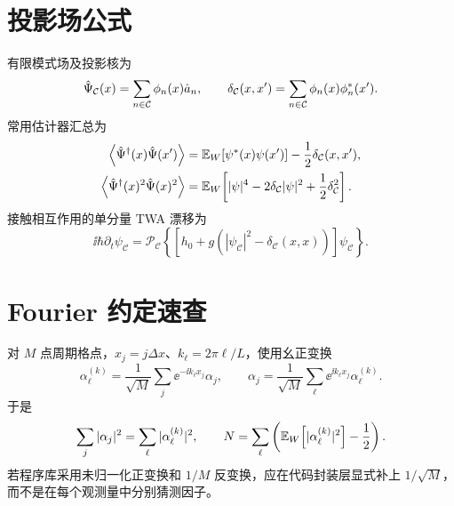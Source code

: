 \section{投影场公式}

有限模式场及投影核为
\begin{equation}
  \hat{\Psi}_{\mathcal C}(x)=\sum_{n\in\mathcal C}\phi_n(x)\hat a_n,
  \qquad
  \delta_{\mathcal C}(x,x')=\sum_{n\in\mathcal C}
  \phi_n(x)\phi_n^*(x').
\end{equation}
常用估计器汇总为
\begin{align}
  \left\langle \hat{\Psi}^{\dagger}(x)\hat{\Psi}(x')\right\rangle
  &=\mathbb{E}_{W}\!\left[\psi^*(x)\psi(x')\right]
  -\frac12\delta_{\mathcal C}(x,x'),\\
  \left\langle \hat{\Psi}^{\dagger}(x)^2\hat{\Psi}(x)^2\right\rangle
  &=\mathbb{E}_{W}\!\left[|\psi|^4-2\delta_{\mathcal C}|\psi|^2
  +\frac12\delta_{\mathcal C}^2\right].
\end{align}
接触相互作用的单分量 TWA 漂移为
\begin{equation}
  \ii\hbar\partial_t\psi_{\mathcal C}
  =\mathcal P_{\mathcal C}\left\{
  [h_0+g(|\psi_{\mathcal C}|^2-\delta_{\mathcal C}(x,x))]
  \psi_{\mathcal C}\right\}.
\end{equation}

\section{Fourier 约定速查}

对 $M$ 点周期格点，$x_j=j\Delta x$、$k_\ell=2\pi\ell/L$，使用幺正变换
\begin{equation}
  \alpha_\ell^{(k)}=\frac1{\sqrt M}\sum_j
  \ee^{-\ii k_\ell x_j}\alpha_j,
  \qquad
  \alpha_j=\frac1{\sqrt M}\sum_\ell
  \ee^{\ii k_\ell x_j}\alpha_\ell^{(k)}.
\end{equation}
于是
\begin{equation}
  \sum_j|\alpha_j|^2=\sum_\ell|\alpha_\ell^{(k)}|^2,
  \qquad
  N=\sum_\ell\left(\mathbb{E}_{W}\!\left[|\alpha_\ell^{(k)}|^2\right]-\frac12\right).
\end{equation}
若程序库采用未归一化正变换和 $1/M$ 反变换，应在代码封装层显式补上 $1/\sqrt M$，而不是在每个观测量中分别猜测因子。

